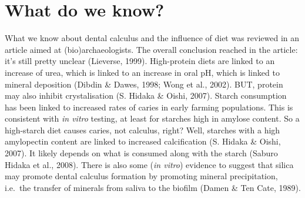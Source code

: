 \documentclass[
  letterpaper,
]{book}
\begin{document}
\hypertarget{what-do-we-know}{%
\section{What do we know?}\label{what-do-we-know}}

What we know about dental calculus and the influence of diet was
reviewed in an article aimed at (bio)archaeologists. The overall
conclusion reached in the article: it's still pretty unclear (Lieverse,
1999). High-protein diets are linked to an increase of urea, which is
linked to an increase in oral pH, which is linked to mineral deposition
(Dibdin \& Dawes, 1998; Wong et al., 2002). BUT, protein may also
inhibit crystalisation (S. Hidaka \& Oishi, 2007). Starch consumption
has been linked to increased rates of caries in early farming
populations. This is consistent with \emph{in vitro} testing, at least
for starches high in amylose content. So a high-starch diet causes
caries, not calculus, right? Well, starches with a high amylopectin
content are linked to increased calcification (S. Hidaka \& Oishi,
2007). It likely depends on what is consumed along with the starch
(Saburo Hidaka et al., 2008). There is also some (\emph{in vitro})
evidence to suggest that silica may promote dental calculus formation by
promoting mineral precipitation, i.e.~the transfer of minerals from
saliva to the biofilm (Damen \& Ten Cate, 1989).
\end{document}

